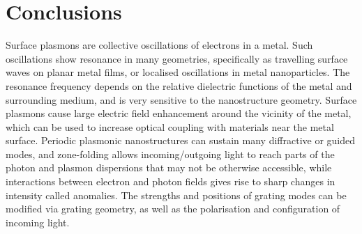 \section{Conclusions}
Surface plasmons are collective oscillations of electrons in a metal. Such oscillations show resonance in many geometries, specifically as travelling surface waves on planar metal films, or localised oscillations in metal nanoparticles. The resonance frequency depends on the relative dielectric functions of the metal and surrounding medium, and is very sensitive to the nanostructure geometry. Surface plasmons cause large electric field enhancement around the vicinity of the metal, which can be used to increase optical coupling with materials near the metal surface. Periodic plasmonic nanostructures can sustain many diffractive or guided modes, and zone-folding allows incoming/outgoing light to reach parts of the photon and plasmon dispersions that may not be otherwise accessible, while interactions between electron and photon fields gives rise to sharp changes in intensity called anomalies. The strengths and positions of grating modes can be modified via grating geometry, as well as the polarisation and configuration of incoming light.